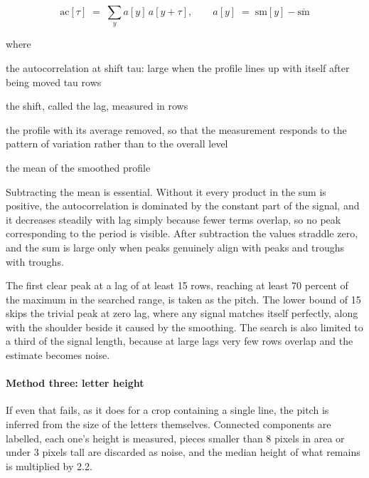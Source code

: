 \begin{equation}
\mathrm{ac}[\tau] \;=\; \sum_{y} a[y]\,a[y+\tau],\qquad a[y] \;=\; \mathrm{sm}[y] - \overline{\mathrm{sm}}
\end{equation}

\noindent where
\begin{description}[leftmargin=2.4em,style=nextline,font=\normalfont\ttfamily]\setlength\itemsep{1pt}
  \item[{$\mathrm{ac}[\tau]$}] \normalfont the autocorrelation at shift tau: large when the profile lines up with itself after being moved tau rows
  \item[{$\tau$}] \normalfont the shift, called the lag, measured in rows
  \item[{$a[y]$}] \normalfont the profile with its average removed, so that the measurement responds to the pattern of variation rather than to the overall level
  \item[{$\overline{\mathrm{sm}}$}] \normalfont the mean of the smoothed profile
\end{description}
Subtracting the mean is essential. Without it every product in the sum is positive, the autocorrelation is dominated by the constant part of the signal, and it decreases steadily with lag simply because fewer terms overlap, so no peak corresponding to the period is visible. After subtraction the values straddle zero, and the sum is large only when peaks genuinely align with peaks and troughs with troughs.

The first clear peak at a lag of at least 15 rows, reaching at least 70 percent of the maximum in the searched range, is taken as the pitch. The lower bound of 15 skips the trivial peak at zero lag, where any signal matches itself perfectly, along with the shoulder beside it caused by the smoothing. The search is also limited to a third of the signal length, because at large lags very few rows overlap and the estimate becomes noise.


\paragraph{Method three: letter height}
If even that fails, as it does for a crop containing a single line, the pitch is inferred from the size of the letters themselves. Connected components are labelled, each one's height is measured, pieces smaller than 8 pixels in area or under 3 pixels tall are discarded as noise, and the median height of what remains is multiplied by 2.2.


